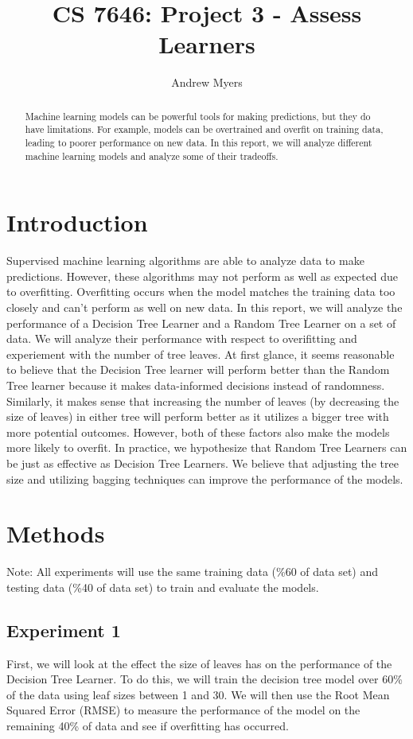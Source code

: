 \documentclass[
	letterpaper, %
]{jdf}
\author{Andrew Myers}
\title{CS 7646: Project 3 - Assess Learners}
\begin{document}

\maketitle

\begin{abstract}
	Machine learning models can be powerful tools for making predictions, but they do have limitations.
	For example, models can be overtrained and overfit on training data, leading to poorer performance on new data.
	In this report, we will analyze different machine learning models and analyze some of their tradeoffs.
\end{abstract}

\section{Introduction}
Supervised machine learning algorithms are able to analyze data to make predictions.
However, these algorithms may not perform as well as expected due to overfitting.
Overfitting occurs when the model matches the training data too closely and can't perform as well on new data.
In this report, we will analyze the performance of a Decision Tree Learner and a Random Tree Learner on a set of data.
We will analyze their performance with respect to overifitting and experiement with the number of tree leaves.
At first glance, it seems reasonable to believe that the Decision Tree learner will perform better than the Random Tree learner because it makes data-informed decisions instead of randomness.
Similarly, it makes sense that increasing the number of leaves (by decreasing the size of leaves) in either tree will perform better as it utilizes a bigger tree with more potential outcomes.
However, both of these factors also make the models more likely to overfit.
In practice, we hypothesize that Random Tree Learners can be just as effective as Decision Tree Learners.
We believe that adjusting the tree size and utilizing bagging techniques can improve the performance of the models.

\section{Methods}

Note: All experiments will use the same training data (\%60 of data set) and testing data (\%40 of data set) to train and evaluate the models.
\subsection{Experiment 1}
First, we will look at the effect the size of leaves has on the performance of the Decision Tree Learner.
To do this, we will train the decision tree model over 60\% of the data using leaf sizes between 1 and 30.
We will then use the Root Mean Squared Error (RMSE) to measure the performance of the model on the remaining 40\% of data and see if overfitting has occurred.
\end{document}
